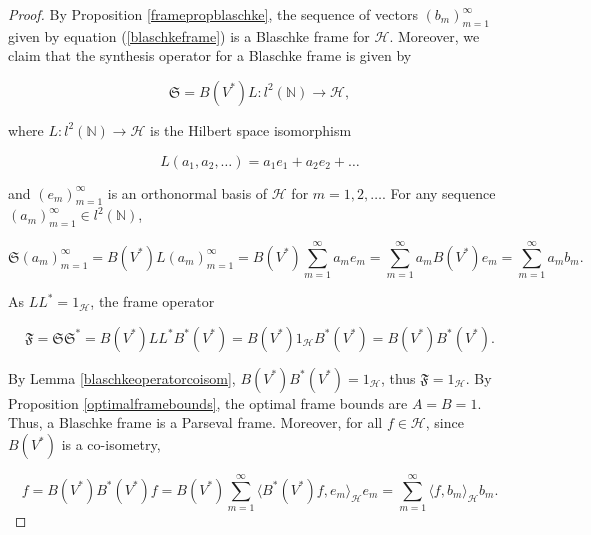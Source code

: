 \documentclass[10pt, reqno]{amsart}
\theoremstyle{definition}
\numberwithin{equation}{section}
\begin{document}
\begin{proof}
By Proposition \ref{framepropblaschke}, the sequence of vectors $(b_{m})_{m=1}^{\infty}$ given by equation (\ref{blaschkeframe}) is a Blaschke frame for $\mathcal{H}$. Moreover, we claim that the synthesis operator for a Blaschke frame is given by

\begin{equation}\label{synthesisoperator}
    \mathfrak{S}=B(V^{*})L: l^{2}(\mathbb{N})\rightarrow \mathcal{H},
\end{equation}

\noindent where $L: l^{2}(\mathbb{N})\rightarrow \mathcal{H}$ is the Hilbert space isomorphism


$$L(a_{1},a_{2},\hdots) = a_{1}e_{1}+a_{2}e_{2}+\hdots$$

\noindent and $(e_{m})_{m=1}^{\infty}$ is an orthonormal basis of $\mathcal{H}$ for $m=1,2,\hdots$. For any sequence $(a_{m})_{m=1}^{\infty}\in l^{2}(\mathbb{N})$,


$$\mathfrak{S}(a_{m})_{m=1}^{\infty} = B(V^{*})L(a_{m})_{m=1}^{\infty} = B(V^{*})\sum_{m=1}^{\infty}a_{m}e_{m} = \sum_{m=1}^{\infty}a_{m}B(V^{*})e_{m}=\sum_{m=1}^{\infty}a_{m}b_{m}.$$



\noindent As $LL^{*}=1_{\mathcal{H}}$, the frame operator 

$$\mathfrak{F}=\mathfrak{S}\mathfrak{S}^{*}=B(V^{*})LL^{*}B^{*}(V^{*})=B(V^{*})1_{\mathcal{H}}B^{*}(V^{*})=B(V^{*})B^{*}(V^{*}).$$

\noindent By Lemma \ref{blaschkeoperatorcoisom}, $B(V^{*})B^{*}(V^{*})=1_{\mathcal{H}}$, thus $\mathfrak{F}=1_{\mathcal{H}}$. By Proposition \ref{optimalframebounds}, the optimal frame bounds are $A=B=1$. Thus, a Blaschke frame is a Parseval frame. Moreover, for all $f\in \mathcal{H}$, since $B(V^{*})$ is a co-isometry,

$$f = B(V^{*})B^{*}(V^{*})f
    = B(V^{*})\sum_{m=1}^{\infty}\langle B^{*}(V^{*})f, e_{m}\rangle_{\mathcal{H}}e_{m}
    = \sum_{m=1}^{\infty}\langle f, b_{m}\rangle_{\mathcal{H}}b_{m}.
$$\end{proof}

\end{document}
